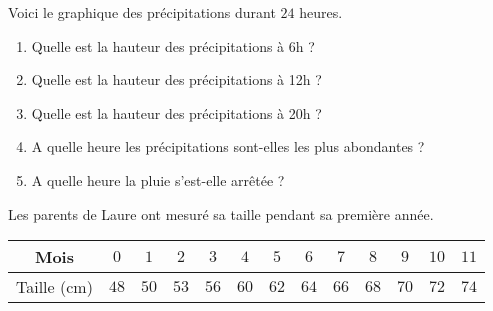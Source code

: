 \begin{pageAD}



\begin{minipage}{0.58\linewidth}

Voici le graphique des précipitations durant $24$ heures.
 

\end{minipage} 
\begin{minipage}{0.38\linewidth}

\begin{enumerate}[leftmargin=*]
\item Quelle est la hauteur des précipitations à 6h ? 
\item Quelle est la hauteur des précipitations à 12h ? 
\item Quelle est la hauteur des précipitations à 20h ? 
\item A quelle heure les précipitations sont-elles les plus abondantes ? 
\item A quelle heure la pluie s'est-elle arrêtée ?  
\end{enumerate}


\end{minipage} 





Les parents de Laure ont mesuré sa taille pendant sa première année.
\begin{center}
\begin{tabular}{|c|c|c|c|c|c|c|c|c|c|c|c|c|}\hline
Mois & $0$ & $1$ & $2$ & $3$ & $4$ & $5$ & $6$ & $7$ & $8$ & $9$ & $10$ & $11$ \\\hline
Taille (cm) & $48$ & $50$ & $53$ & $56$ & $60$ & $62$ & $64$ & $66$ & $68$ &$70$ & $72$ & $74$ \\\hline
\end{tabular}
\end{center}


\end{pageAD}
